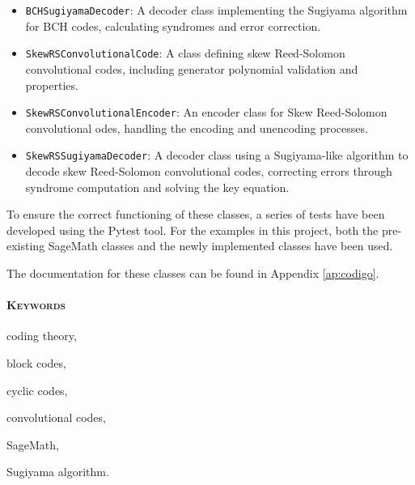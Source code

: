 \begin{itemize}
    \item \texttt{BCHSugiyamaDecoder}: A decoder class implementing the Sugiyama algorithm for BCH codes, calculating syndromes and error correction.
    \item \texttt{SkewRSConvolutionalCode}: A class defining skew Reed-Solomon convolutional codes, including generator polynomial validation and properties.
    \item \texttt{SkewRSConvolutionalEncoder}: An encoder class for Skew Reed-Solomon convolutional odes, handling the encoding and unencoding processes.
    \item \texttt{SkewRSSugiyamaDecoder}: A decoder class using a Sugiyama-like algorithm to decode skew Reed-Solomon convolutional codes, correcting errors through syndrome computation and solving the key equation.
\end{itemize}

To ensure the correct functioning of these classes, a series of tests have been developed using the Pytest tool. For the examples in this project, both the pre-existing SageMath classes and the newly implemented classes have been used.

The documentation for these classes can be found in Appendix \ref{ap:codigo}.

\paragraph{\textsc{Keywords}}
\begin{inparaitem}[\hspace{1em}]
  \item coding theory,
  \item block codes,
  \item cyclic codes,
  \item convolutional codes,
  \item SageMath,
  \item Sugiyama algorithm.
\end{inparaitem}


 
\endinput
